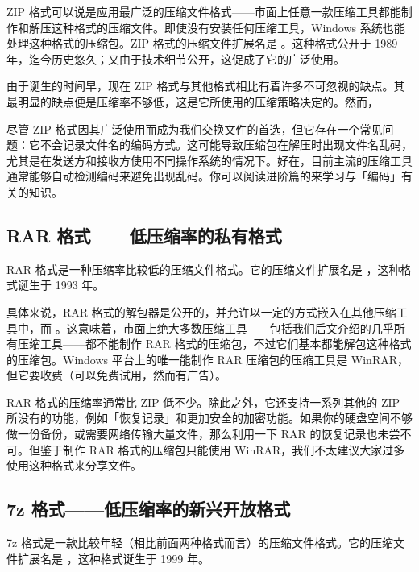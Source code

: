 ZIP 格式可以说是应用最广泛的压缩文件格式——市面上任意一款压缩工具都能制作和解压这种格式的压缩文件。即使没有安装任何压缩工具，Windows 系统也能处理这种格式的压缩包。ZIP 格式的压缩文件扩展名是 。这种格式公开于 1989 年，迄今历史悠久；又由于技术细节公开，这促成了它的广泛使用。

由于诞生的时间早，现在 ZIP 格式与其他格式相比有着许多不可忽视的缺点。其最明显的缺点便是压缩率不够低，这是它所使用的压缩策略决定的。然而，

\begin{note}
  尽管 ZIP 格式因其广泛使用而成为我们交换文件的首选，但它存在一个常见问题：它不会记录文件名的编码方式。这可能导致压缩包在解压时出现文件名乱码，尤其是在发送方和接收方使用不同操作系统的情况下。好在，目前主流的压缩工具通常能够自动检测编码来避免出现乱码。你可以阅读进阶篇的来学习与「编码」有关的知识。
\end{note}
\subsection{RAR 格式——低压缩率的私有格式}
RAR 格式是一种压缩率比较低的压缩文件格式。它的压缩文件扩展名是 ，这种格式诞生于 1993 年。

具体来说，RAR 格式的解包器是公开的，并允许以一定的方式嵌入在其他压缩工具中，而 。这意味着，市面上绝大多数压缩工具——包括我们后文介绍的几乎所有压缩工具——都不能制作 RAR 格式的压缩包，不过它们基本都能解包这种格式的压缩包。Windows 平台上的唯一能制作 RAR 压缩包的压缩工具是 WinRAR，但它要收费（可以免费试用，然而有广告）。

RAR 格式的压缩率通常比 ZIP 低不少。除此之外，它还支持一系列其他的 ZIP 所没有的功能，例如「恢复记录」和更加安全的加密功能。如果你的硬盘空间不够做一份备份，或需要网络传输大量文件，那么利用一下 RAR 的恢复记录也未尝不可。但鉴于制作 RAR 格式的压缩包只能使用 WinRAR，我们不太建议大家过多使用这种格式来分享文件。

\subsection{7z 格式——低压缩率的新兴开放格式}

7z 格式是一款比较年轻（相比前面两种格式而言）的压缩文件格式。它的压缩文件扩展名是 ，这种格式诞生于 1999 年。

